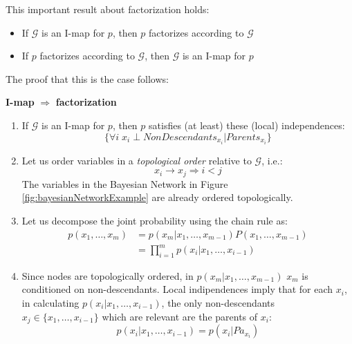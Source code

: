 This important result about factorization holds:
\begin{itemize}
    \item If $\mathcal{G}$ is an I-map for $p$, then $p$ factorizes according to $\mathcal{G}$
    \item If $p$ factorizes according to $\mathcal{G}$, then $\mathcal{G}$ is an I-map for $p$
\end{itemize}

The proof that this is the case follows: \newline

\textbf{I-map} $\Rightarrow$ \textbf{factorization}
\begin{enumerate}
    \item If $\mathcal{G}$ is an I-map for $p$, then $p$ satisfies (at least) these (local) independences:
    $$\{ \forall i \; x_i \perp \mathit{NonDescendants}_{x_i} | \mathit{Parents}_{x_i}\}$$
    
    \item Let us order variables in a \textit{topological order} relative to $\mathcal{G}$, i.e.:
    $$x_i \rightarrow x_j \Rightarrow i<j$$
    The variables in the Bayesian Network in Figure \ref{fig:bayesianNetworkExample} are already ordered topologically.
    
    \item Let us decompose the joint probability using the chain rule as:
    \begin{align*}
        p(x_1, \hdots, x_m) &= p(x_m | x_1, \hdots, x_{m-1})P(x_1,\hdots,x_{m-1})\\
        &= \prod_{i=1}^m p(x_i | x_1, \hdots, x_{i-1})
    \end{align*}
    
    \item Since nodes are topologically ordered, in $p(x_m | x_1, \hdots, x_{m-1})$ $x_m$ is conditioned on non-descendants. Local indipendences imply that for each $x_i$, in calculating $p(x_i | x_1, \hdots, x_{i-1})$, the only non-descendants $x_j \in \{x_1, \hdots, x_{i-1}\}$ which are relevant are the parents of $x_i$:
    $$p(x_i | x_1, \hdots, x_{i-1}) = p(x_i | \mathit{Pa}_{x_i})$$
\end{enumerate}

